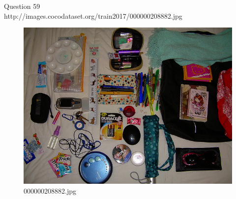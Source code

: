 Question 59\\
http://images.cocodataset.org/train2017/000000208882.jpg
\begin{figure}[h]
    \centering
    \includegraphics[width=0.8\linewidth]{../image set/hard/000000208882.jpg}
    \caption{000000208882.jpg}
\end{figure}
